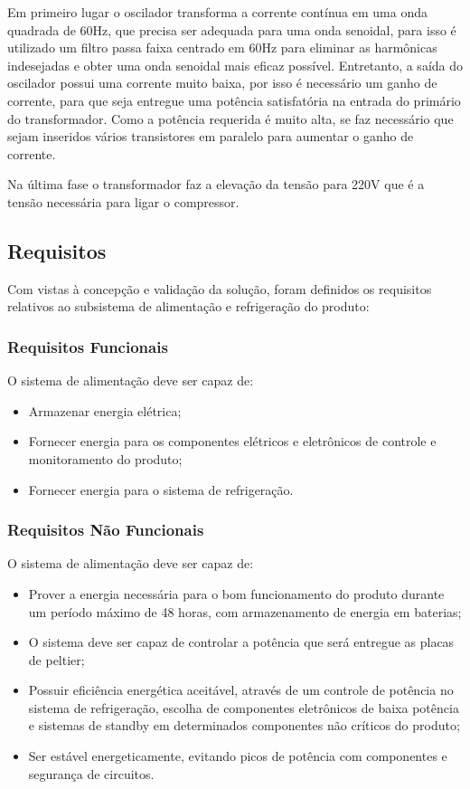 Em primeiro lugar o oscilador transforma a corrente contínua em uma onda quadrada de 60Hz, que precisa ser adequada para uma onda senoidal, para isso é utilizado um filtro passa faixa centrado em 60Hz para eliminar as harmônicas indesejadas e obter uma onda senoidal mais eficaz possível. Entretanto, a saída do oscilador possui uma corrente muito baixa, por isso é necessário um ganho de corrente, para que seja entregue uma potência satisfatória na entrada do primário do transformador. Como a potência requerida é muito alta, se faz necessário que sejam inseridos vários transistores em paralelo para aumentar o ganho de corrente.

Na última fase o transformador faz a elevação da tensão para 220V que é a tensão necessária para ligar o compressor.

\subsection{Requisitos}
Com vistas à concepção e validação da solução, foram definidos os requisitos relativos ao subsistema de alimentação e refrigeração do produto:

\subsubsection{Requisitos Funcionais}
O sistema de alimentação deve ser capaz de:
\begin{itemize}
\item Armazenar energia elétrica;
 \item Fornecer energia para os componentes elétricos e eletrônicos de controle e monitoramento do produto;
 \item Fornecer energia para o sistema de refrigeração.
 \end{itemize}
\subsubsection{Requisitos Não Funcionais}
O sistema de alimentação deve ser capaz de:
\begin{itemize}
\item Prover a energia necessária para o bom funcionamento do produto durante um período máximo de 48 horas, com armazenamento de energia em baterias;
\item O sistema deve ser capaz de controlar a potência que será entregue as placas de peltier;
 \item Possuir eficiência energética aceitável, através de um controle de potência no sistema de refrigeração, escolha de componentes eletrônicos de baixa potência e sistemas de standby em determinados componentes não críticos do produto;
 \item Ser estável energeticamente, evitando picos de potência com componentes e segurança de circuitos.
 \end{itemize}